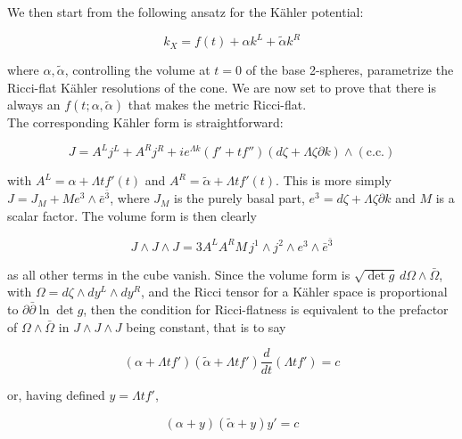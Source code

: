 We then start from the following ansatz for the K\"ahler potential:

\begin{equation}
	k_X = f(t) + \alpha k^L + \tilde\alpha k^R
\end{equation}

where $\alpha,\tilde\alpha$, controlling the volume at $t=0$ of the base 2-spheres, parametrize the Ricci-flat K\"ahler resolutions of the cone. We are now set to prove that there is always an $f(t;\alpha,\tilde\alpha)$ that makes the metric Ricci-flat.\\

The corresponding K\"ahler form is straightforward:

\begin{equation}
	J = A^L j^L + A^R j^R + i e^{\Lambda k} (f' + t f'') (d\zeta + \Lambda \zeta \partial k) \wedge (\mathrm{c.c.})
\end{equation}

\newcommand{\fibral}{e^3 \wedge \bar e^{\bar 3}}

with $A^L = \alpha + \Lambda t f'(t)$ and  $A^R = \tilde\alpha + \Lambda t f'(t)$. This is more simply $J = J_M + M \fibral$, where $J_M$ is the purely basal part, $e^3 = d\zeta + \Lambda \zeta \partial k$ and $M$ is a scalar factor. The volume form is then clearly

\begin{equation}
	J \wedge J \wedge J = 3 A^L A^R M \, j^1 \wedge j^2 \wedge \fibral
\end{equation}

as all other terms in the cube vanish. Since the volume form is $\sqrt{\det g} \, d\Omega \wedge \bar \Omega$, with $\Omega = d\zeta \wedge dy^L \wedge dy^R$, and the Ricci tensor for a K\"ahler space is proportional to $\partial \bar \partial \ln \det g$, then the condition for Ricci-flatness is equivalent to the prefactor of $\Omega \wedge \bar \Omega$ in $J\wedge J \wedge J$ being constant, that is to say

\begin{equation}
	(\alpha + \Lambda t f')(\tilde{\alpha} + \Lambda t f') \frac{d}{dt} (\Lambda t f') = c \label{rflatcondition}
\end{equation}

or, having defined $y = \Lambda t f'$,

\begin{equation}
	(\alpha + y)(\tilde{\alpha} + y) y' = c
\end{equation}

